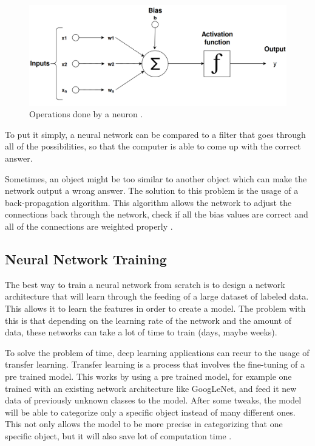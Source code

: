     
    \begin{figure}[htb]
        \centering
        \includegraphics[scale = 0.15]{Sections/2StateOfTheArt/2_images/neuron.png}
        \caption[Operations done by a neuron.]{Operations done by a neuron \cite{neuron}.}
        \label{fig:neuron}
    \end{figure}
    
    
   
    \par To put it simply, a neural network can be compared to a filter that goes through all of the possibilities, so that the computer is able to come up with the correct answer.
    \par Sometimes, an object might be too similar to another object which can make the network output a wrong answer. The solution to this problem is the usage of a back-propagation algorithm. This algorithm allows the network to adjust the connections back through the network, check if all the bias values are correct and all of the connections are weighted properly \cite{ArmaanMerchant2018}.
    


    \subsection{Neural Network Training}
    \par The best way to train a neural network from scratch is to design a network architecture that will learn through the feeding of a large dataset of labeled data. This allows it to learn the features in order to create a model. The problem with this is that depending on the learning rate of the network and the amount of data, these networks can take a lot of time to train (days, maybe weeks). 

    \par To solve the problem of time, deep learning applications can recur to the usage of transfer learning. Transfer learning is a process that involves the fine-tuning of a pre trained model. This works by using a pre trained model, for example one trained with an existing network architecture like GoogLeNet, and feed it new data of previously unknown classes to the model. After some tweaks, the model will be able to categorize only a specific object instead of many different ones. This not only allows the model to be more precise in categorizing that one specific object, but it will also save lot of computation time \cite{mathworks_deeplearning}.


